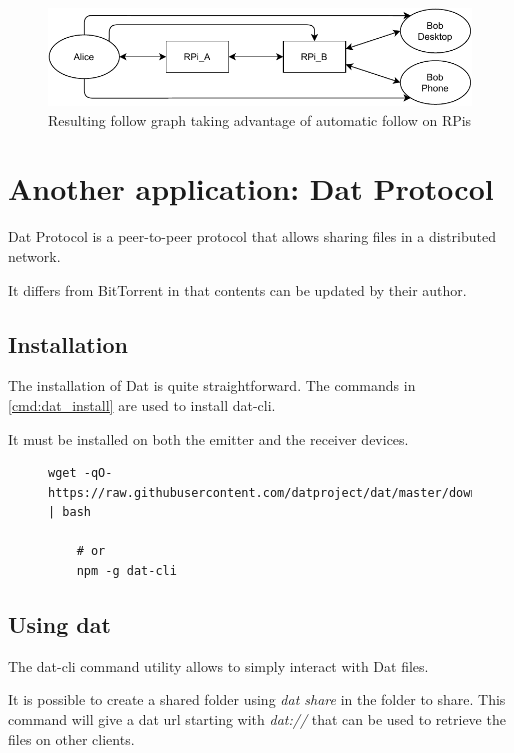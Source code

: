 \documentclass[a4paper,11pt,oneside]{report}
\begin{document}
\begin{figure}
  \includegraphics[width=\linewidth]{figures/complexFinal.pdf}
  \caption{Resulting follow graph taking advantage of automatic follow on RPis}
  \label{fig:complexFinal}
\end{figure}

\chapter{Another application: Dat Protocol}

Dat Protocol is a peer-to-peer protocol that allows sharing files in a distributed network.

It differs from BitTorrent in that contents can be updated by their author.


\section{Installation}

The installation of Dat is quite straightforward. The commands in \ref{cmd:dat_install} are used to install dat-cli.

It must be installed on both the emitter and the receiver devices.

\begin{figure}
  \begin{lstlisting}[label=cmd:dat_install, caption=Installing dat-cli]
    wget -qO- https://raw.githubusercontent.com/datproject/dat/master/download.sh | bash
    
    # or
    npm -g dat-cli
  \end{lstlisting}
\end{figure}

\section{Using dat}

The dat-cli command utility allows to simply interact with Dat files.

It is possible to create a shared folder using \emph{dat share} in the folder to share. This command will give a dat url starting with \emph{dat://} that can be used to retrieve the files on other clients.
\end{document}
